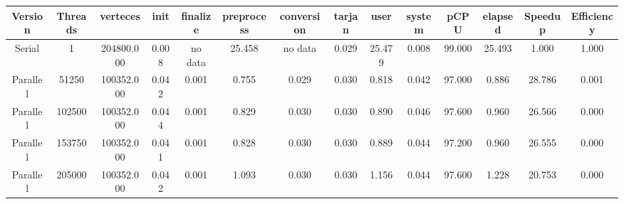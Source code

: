 \begin{tabular}{|c|c|c|c|c|c|c|c|c|c|c|c|c|c|}
\toprule
 Version &  Threads &   verteces &  init & finalize &  preprocess & conversion &  tarjan &   user &  system &   pCPU &  elapsed &  Speedup &  Efficiency \\
\midrule
  Serial &        1 & 204800.000 & 0.008 &  no data &      25.458 &    no data &   0.029 & 25.479 &   0.008 & 99.000 &   25.493 &    1.000 &       1.000 \\
Parallel &    51250 & 100352.000 & 0.042 &    0.001 &       0.755 &      0.029 &   0.030 &  0.818 &   0.042 & 97.000 &    0.886 &   28.786 &       0.001 \\
Parallel &   102500 & 100352.000 & 0.044 &    0.001 &       0.829 &      0.030 &   0.030 &  0.890 &   0.046 & 97.600 &    0.960 &   26.566 &       0.000 \\
Parallel &   153750 & 100352.000 & 0.041 &    0.001 &       0.828 &      0.030 &   0.030 &  0.889 &   0.044 & 97.200 &    0.960 &   26.555 &       0.000 \\
Parallel &   205000 & 100352.000 & 0.042 &    0.001 &       1.093 &      0.030 &   0.030 &  1.156 &   0.044 & 97.600 &    1.228 &   20.753 &       0.000 \\
\bottomrule
\end{tabular}
